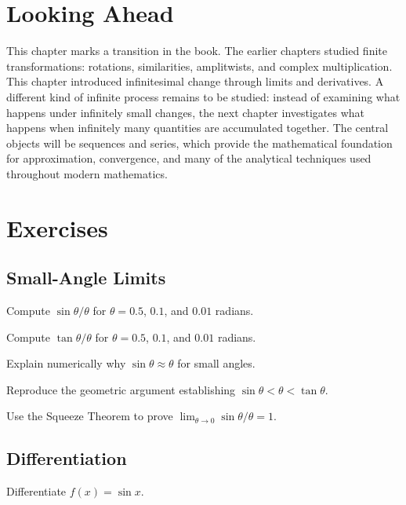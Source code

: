 \section{Looking Ahead}

This chapter marks a transition in the book. The earlier chapters
studied finite transformations: rotations, similarities, amplitwists,
and complex multiplication. This chapter introduced infinitesimal change
through limits and derivatives. A different kind of infinite process
remains to be studied: instead of examining what happens under
infinitely small changes, the next chapter investigates what happens
when infinitely many quantities are accumulated together. The central
objects will be sequences and series, which provide the mathematical
foundation for approximation, convergence, and many of the analytical
techniques used throughout modern mathematics.

\section{Exercises}

\subsection*{Small-Angle Limits}
\begin{exercise}
Compute $\sin\theta/\theta$ for $\theta = 0.5$, $0.1$, and $0.01$
radians.
\end{exercise}

\begin{exercise}
Compute $\tan\theta/\theta$ for $\theta = 0.5$, $0.1$, and $0.01$
radians.
\end{exercise}

\begin{exercise}
Explain numerically why $\sin\theta \approx \theta$ for small angles.
\end{exercise}

\begin{exercise}
Reproduce the geometric argument establishing $\sin\theta < \theta <
\tan\theta$.
\end{exercise}

\begin{exercise}
Use the Squeeze Theorem to prove $\lim_{\theta\to0} \sin\theta/\theta =
1$.
\end{exercise}

\subsection*{Differentiation}
\begin{exercise}
Differentiate $f(x) = \sin x$.
\end{exercise}

